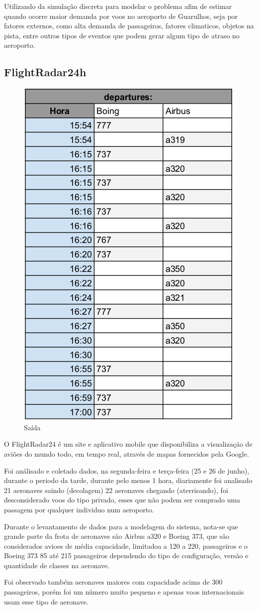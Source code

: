 \documentclass[12pt]{article}
\begin{document}
Utilizando da simulação discreta para modelar o problema afim de estimar
quando ocorre maior demanda por voos no aeroporto de Guarulhos, seja por
fatores externos, como alta demanda de passageiros, fatores climaticos,
objetos na pista, entre outros tipos de eventos que podem gerar algum 
tipo de atraso no aeroporto.

\subsection{FlightRadar24h}


\begin{figure}[h!]
  \centering
  \includegraphics[width=.3\textwidth]{decolagem.png}
  \caption{Saída}
  \label{fig:saida}
\end{figure}

O  FlightRadar24 é um site e aplicativo mobile que disponibiliza a
visualização de aviões do mundo todo, em tempo real, através de mapas 
fornecidos pela Google.

Foi análisado e coletado dados, na segunda-feira e terça-feira (25 e 26 de junho), durante 
o periodo da tarde, durante pelo menos 1 hora, diariamente foi analisado 21
aeronaves saindo (decolagem) 22 aeronaves chegando (aterrisando), foi desconsiderado voos do 
tipo privado, esses que não podem ser comprado uma passagem por qualquer
individuo num aeroporto.

Durante o levantamento de dados para a modelagem do sistema, nota-se que grande parte
da frota de aeronaves são Airbus a320 e Boeing 373, que são considerados avioes de média
capacidade, limitadoa a 120 a 220, passageiros e o Boeing 373 85 até 215 passageiros 
dependendo do tipo de configuração, versão e quantidade de classes na aeronave.

Foi observado também aeronaves maiores com capacidade acima de 300 passageiros, porém 
foi um número muito pequeno e apenas voos internacionais usam esse tipo de aeronave.
\end{document}
